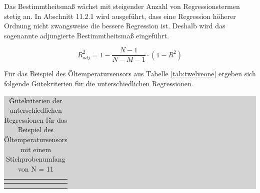\noindent Das Bestimmtheitsma{\ss} w\"{a}chst mit steigender Anzahl von Regressionstermen stetig an. In Abschnitt 11.2.1 wird ausgef\"{u}hrt, dass eine Regression h\"{o}herer Ordnung nicht zwangsweise die bessere Regression ist. Deshalb wird das sogenannte adjungierte Bestimmtheitsma{\ss} eingef\"{u}hrt. 

\begin{equation}\label{eq:twelveonehundredtwenty}
R_{adj}^{2} =1-\dfrac{N-1}{N-M-1} \cdot (1-R^{2})
\end{equation}

\noindent F\"{u}r das Beispiel des \"{O}ltemperatursensors aus Tabelle \ref{tab:twelveone} ergeben sich folgende G\"{u}tekriterien f\"{u}r die unterschiedlichen Regressionen.

\begin{table}[H]
\setlength{\arrayrulewidth}{.1em}
\caption{G\"{u}tekriterien der unterschiedlichen Regressionen f\"{u}r das Beispiel des \"{O}ltemperatursensors mit einem Stichprobenumfang von N = 11}
\setlength{\fboxsep}{0pt}%
\colorbox{lightgray}{%
%
\begin{tabular}{| c | c | c | c | c | c |}
\hline
\parbox[c][0.65in][c]{0.95in}{\smallskip\centering\textbf{\selectfont{Ordnung \\
Regression}}} & 
\parbox[c][0.65in][c]{0.95in}{\smallskip\centering\textbf{\selectfont{FG}}} & 
\parbox[c][0.65in][c]{0.95in}{\smallskip\centering\textbf{\selectfont{a}}} & 
\parbox[c][0.65in][c]{0.95in}{\smallskip\centering\textbf{}} & 
\parbox[c][0.65in][c]{0.95in}{\smallskip\centering\textbf{}} & 
\parbox[c][0.65in][c]{0.95in}{\smallskip\centering\textbf{}}\\ \hline

\parbox[c][0.3in][c]{0.95in}{} &
\parbox[c][0.3in][c]{0.95in}{} &
\parbox[c][0.3in][c]{0.95in}{} &
\parbox[c][0.3in][c]{0.95in}{} &
\parbox[c][0.3in][c]{0.95in}{} &
\parbox[c][0.3in][c]{0.95in}{}\\ \hline

\parbox[c][0.3in][c]{0.95in}{} &
\parbox[c][0.3in][c]{0.95in}{} &
\parbox[c][0.3in][c]{0.95in}{} &
\parbox[c][0.3in][c]{0.95in}{} &
\parbox[c][0.3in][c]{0.95in}{} &
\parbox[c][0.3in][c]{0.95in}{}\\ \hline


\end{tabular}}
\end{table}
